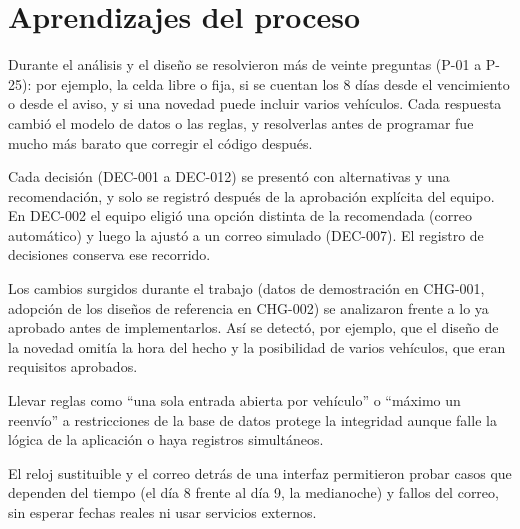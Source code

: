 \section{Aprendizajes del proceso}
\begin{description}[style=nextline]
  \item[Las preguntas tempranas evitaron rehacer trabajo] Durante el análisis y el diseño se resolvieron más de veinte preguntas (P-01 a P-25): por ejemplo, la celda libre o fija, si se cuentan los 8 días desde el vencimiento o desde el aviso, y si una novedad puede incluir varios vehículos. Cada respuesta cambió el modelo de datos o las reglas, y resolverlas antes de programar fue mucho más barato que corregir el código después.
  \item[Separar recomendación y decisión] Cada decisión (DEC-001 a DEC-012) se presentó con alternativas y una recomendación, y solo se registró después de la aprobación explícita del equipo. En DEC-002 el equipo eligió una opción distinta de la recomendada (correo automático) y luego la ajustó a un correo simulado (DEC-007). El registro de decisiones conserva ese recorrido.
  \item[Los cambios se gestionan, no se esconden] Los cambios surgidos durante el trabajo (datos de demostración en CHG-001, adopción de los diseños de referencia en CHG-002) se analizaron frente a lo ya aprobado antes de implementarlos. Así se detectó, por ejemplo, que el diseño de la novedad omitía la hora del hecho y la posibilidad de varios vehículos, que eran requisitos aprobados.
  \item[La base de datos como segunda barrera] Llevar reglas como ``una sola entrada abierta por vehículo'' o ``máximo un reenvío'' a restricciones de la base de datos protege la integridad aunque falle la lógica de la aplicación o haya registros simultáneos.
  \item[Diseñar para probar] El reloj sustituible y el correo detrás de una interfaz permitieron probar casos que dependen del tiempo (el día 8 frente al día 9, la medianoche) y fallos del correo, sin esperar fechas reales ni usar servicios externos.
\end{description}

